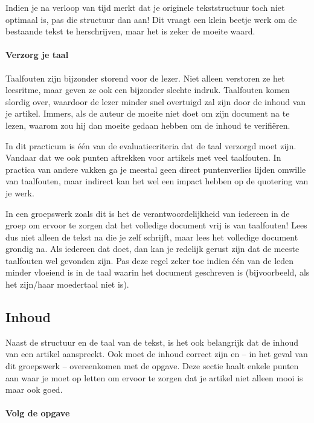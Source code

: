 \documentclass[a4paper]{article}
\begin{document}
Indien je na verloop van tijd merkt dat je originele tekststructuur toch niet optimaal is, pas die structuur dan aan!
Dit vraagt een klein beetje werk om de bestaande tekst te herschrijven, maar het is zeker de moeite waard.


\paragraph{Verzorg je taal}

Taalfouten zijn bijzonder storend voor de lezer.
Niet alleen verstoren ze het leesritme, maar geven ze ook een bijzonder slechte indruk.
Taalfouten komen slordig over, waardoor de lezer minder snel overtuigd zal zijn door de inhoud van je artikel.
Immers, als de auteur de moeite niet doet om zijn document na te lezen, waarom zou hij dan moeite gedaan hebben om de inhoud te verifi\"eren.

In dit practicum is \'e\'en van de evaluatiecriteria dat de taal verzorgd moet zijn.
Vandaar dat we ook punten aftrekken voor artikels met veel taalfouten.
In practica van andere vakken ga je meestal geen direct puntenverlies lijden omwille van taalfouten, maar indirect kan het wel een impact hebben op de quotering van je werk.

In een groepswerk zoals dit is het de verantwoordelijkheid van iedereen in de groep om ervoor te zorgen dat het volledige document vrij is van taalfouten!
Lees dus niet alleen de tekst na die je zelf schrijft, maar lees het volledige document grondig na.
Als iedereen dat doet, dan kan je redelijk gerust zijn dat de meeste taalfouten wel gevonden zijn.
Pas deze regel zeker toe indien \'e\'en van de leden minder vloeiend is in de taal waarin het document geschreven is (bijvoorbeeld, als het zijn/haar moedertaal niet is).


\subsection{Inhoud}

Naast de structuur en de taal van de tekst, is het ook belangrijk dat de inhoud van een artikel aanspreekt.
Ook moet de inhoud correct zijn en -- in het geval van dit groepswerk -- overeenkomen met de opgave.
Deze sectie haalt enkele punten aan waar je moet op letten om ervoor te zorgen dat je artikel niet alleen mooi is maar ook goed.


\paragraph{Volg de opgave}
\end{document}
